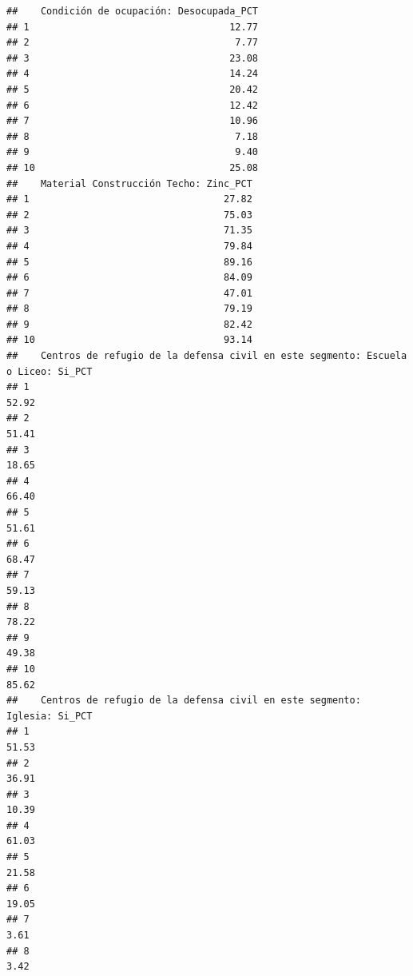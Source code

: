 \documentclass[11pt,]{article}
\begin{document}
\begin{verbatim}
##    Condición de ocupación: Desocupada_PCT
## 1                                   12.77
## 2                                    7.77
## 3                                   23.08
## 4                                   14.24
## 5                                   20.42
## 6                                   12.42
## 7                                   10.96
## 8                                    7.18
## 9                                    9.40
## 10                                  25.08
##    Material Construcción Techo: Zinc_PCT
## 1                                  27.82
## 2                                  75.03
## 3                                  71.35
## 4                                  79.84
## 5                                  89.16
## 6                                  84.09
## 7                                  47.01
## 8                                  79.19
## 9                                  82.42
## 10                                 93.14
##    Centros de refugio de la defensa civil en este segmento: Escuela o Liceo: Si_PCT
## 1                                                                             52.92
## 2                                                                             51.41
## 3                                                                             18.65
## 4                                                                             66.40
## 5                                                                             51.61
## 6                                                                             68.47
## 7                                                                             59.13
## 8                                                                             78.22
## 9                                                                             49.38
## 10                                                                            85.62
##    Centros de refugio de la defensa civil en este segmento: Iglesia: Si_PCT
## 1                                                                     51.53
## 2                                                                     36.91
## 3                                                                     10.39
## 4                                                                     61.03
## 5                                                                     21.58
## 6                                                                     19.05
## 7                                                                      3.61
## 8                                                                      3.42

\end{verbatim}
\end{document}
